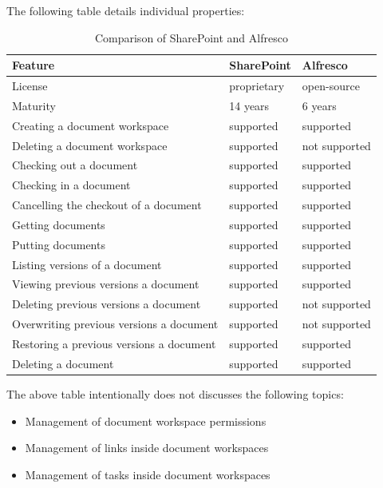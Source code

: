 The following table details individual properties:

\begin{table}[H]
  \begin{center}
    \begin{tabular}{| l | l | l |}
    \hline
    \textbf{Feature} & \textbf{SharePoint} & \textbf{Alfresco} \\ \hline
    License & proprietary & open-source \\ \hline
    Maturity & 14 years\cite{sphist} & 6 years \\ \hline
    Creating a document workspace & supported & supported \\ \hline
    Deleting a document workspace & supported & not supported \\ \hline
    Checking out a document & supported & supported \\ \hline
    Checking in a document & supported & supported \\ \hline
    Cancelling the checkout of a document & supported & supported \\ \hline
    Getting documents & supported & supported \\ \hline
    Putting documents & supported & supported \\ \hline
    Listing versions of a document & supported & supported \\ \hline
    Viewing previous versions a document & supported & supported \\ \hline
    Deleting previous versions a document & supported & not supported \\ \hline
    Overwriting previous versions a document & supported & not supported \\ \hline
    Restoring a previous versions a document & supported & supported \\ \hline
    Deleting a document & supported & supported \\ \hline
    \end{tabular}
  \end{center}
  \caption{Comparison of SharePoint and Alfresco}
  \label{tab:background-comparison}
\end{table}

The above table intentionally does not discusses the following topics:

\begin{itemize}
\item Management of document workspace permissions
\item Management of links inside document workspaces
\item Management of tasks inside document workspaces
\end{itemize}


